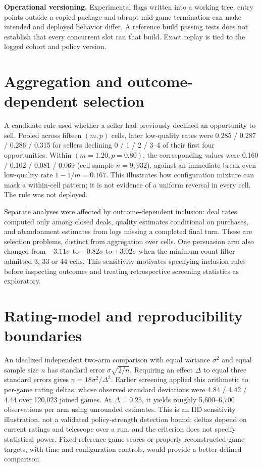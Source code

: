 \documentclass{article}
\begin{document}
\textbf{Operational versioning.} Experimental flags written into a working
tree, entry points outside a copied package and abrupt mid-game termination
can make intended and deployed behavior differ. A reference build passing
tests does not establish that every concurrent slot ran that build. Exact
replay is tied to the logged cohort and policy version.

\section{Aggregation and outcome-dependent selection}
\label{app:simpson}
A candidate rule used whether a seller had previously declined an opportunity
to sell. Pooled across fifteen $(m,p)$ cells, later low-quality rates were
0.285 / 0.287 / 0.286 / 0.315 for sellers declining 0 / 1 / 2 / 3--4 of their
first four opportunities. Within $(m=1.20,p=0.80)$, the corresponding values
were 0.160 / 0.102 / 0.081 / 0.069 (cell sample $n=9,932$), against an immediate
break-even low-quality rate $1-1/m=0.167$. This illustrates how configuration
mixture can mask a within-cell pattern; it is not evidence of a uniform reversal
in every cell. The rule was not deployed.

Separate analyses were affected by outcome-dependent inclusion: deal rates
computed only among closed deals, quality estimates conditional on purchases,
and abandonment estimates from logs missing a completed final turn. These are
selection problems, distinct from aggregation over cells. One persuasion arm
also changed from $-3.11\sigma$ to $-0.82\sigma$ to $+3.02\sigma$ when the
minimum-count filter admitted 3, 33 or 44 cells. This sensitivity motivates
specifying inclusion rules before inspecting outcomes and treating retrospective
screening statistics as exploratory.

\section{Rating-model and reproducibility boundaries}
\label{app:measurement}
An idealized independent two-arm comparison with equal variance $\sigma^2$
and equal sample size $n$ has standard error $\sigma\sqrt{2/n}$. Requiring an
effect $\Delta$ to equal three standard errors gives
$n=18\sigma^2/\Delta^2$. Earlier screening applied this arithmetic to
per-game rating deltas, whose observed standard deviations were
4.84 / 4.42 / 4.44 over 120,023 joined games. At $\Delta=0.25$, it yields
roughly 5,600--6,700 observations per arm using unrounded estimates. This is
an IID sensitivity illustration, not a validated policy-strength detection
bound: deltas depend on current ratings and telescope over a run, and the
criterion does not specify statistical power. Fixed-reference game scores or
properly reconstructed game targets, with time and configuration controls,
would provide a better-defined comparison.
\end{document}

